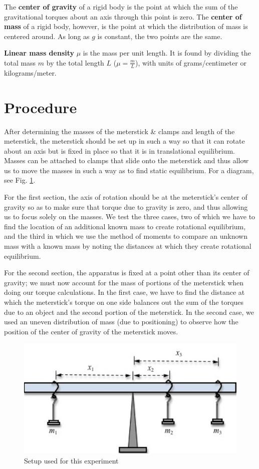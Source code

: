 \documentclass[11pt, titlepage]{article}
\begin{document}
The \textbf{center of gravity} of a rigid body is the point at which the sum of the gravitational torques about an axis through this point is zero. The \textbf{center of mass} of a rigid body, however, is the point at which the distribution of mass is centered around. As long as $g$ is constant, the two points are the same.

\textbf{Linear mass density} $\mu$ is the mass per unit length. It is found by dividing the total mass $m$ by the total length $L$ ($\mu = \frac{m}{L}$), with units of grams/centimeter or kilograms/meter.

\section*{Procedure}
After determining the masses of the meterstick \& clamps and length of the meterstick, the meterstick should be set up in such a way so that it can rotate about an axis but is fixed in place so that it is in translational equilibrium. Masses can be attached to clamps that slide onto the meterstick and thus allow us to move the masses in such a way as to find static equilibrium. For a diagram, see Fig. \ref{fig:1}.

For the first section, the axis of rotation should be at the meterstick's center of gravity so as to make sure that torque due to gravity is zero, and thus allowing us to focus solely on the masses. We test the three cases, two of which we have to find the location of an additional known mass to create rotational equilibrium, and the third in which we use the method of moments to compare an unknown mass with a known mass by noting the distances at which they create rotational equilibrium.

For the second section, the apparatus is fixed at a point other than its center of gravity; we must now account for the mass of portions of the meterstick when doing our torque calculations. In the first case, we have to find the distance at which the meterstick's torque on one side balances out the sum of the torques due to an object and the second portion of the meterstick. In the second case, we used an uneven distribution of mass (due to positioning) to observe how the position of the center of gravity of the meterstick moves.

\begin{figure}[!ht]
\centering
\includegraphics[scale=.8, angle=0]{lab04_setup.png}
\caption{Setup used for this experiment \label{fig:1}}
\end{figure}
\end{document}
